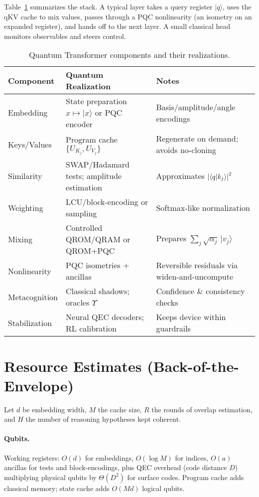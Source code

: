 \documentclass[11pt]{article}
\newcommand{\qket}[1]{\lvert #1 \rangle}
\newcommand{\qip}[2]{\langle #1 \vert #2 \rangle}
\begin{document}
Table~\ref{tab:components} summarizes the stack.
A typical layer takes a query register $\qket{q}$, uses the qKV cache to mix values, passes through a PQC nonlinearity (an isometry on an expanded register), and hands off to the next layer.
A small classical head monitors observables and steers control.

\begin{table}[h]
\centering
\caption{Quantum Transformer components and their realizations.}
\label{tab:components}
\begin{tabular}{@{}lll@{}}
\toprule
\textbf{Component} & \textbf{Quantum Realization} & \textbf{Notes} \\
\midrule
Embedding & State preparation $x\mapsto \qket{x}$ or PQC encoder & Basis/amplitude/angle encodings \\
Keys/Values & Program cache $\{U_{K_j},U_{V_j}\}$ & Regenerate on demand; avoids no-cloning \\
Similarity & SWAP/Hadamard tests; amplitude estimation & Approximates $\abs{\qip{q}{k_j}}^2$ \\
Weighting & LCU/block-encoding or sampling & Softmax-like normalization \\
Mixing & Controlled QROM/QRAM or QROM+PQC & Prepares $\sum_j \sqrt{\alpha_j}\,\qket{v_j}$ \\
Nonlinearity & PQC isometries + ancillas & Reversible residuals via widen-and-uncompute \\
Metacognition & Classical shadows; oracles $\Upsilon$ & Confidence \& consistency checks \\
Stabilization & Neural QEC decoders; RL calibration & Keeps device within guardrails \\
\bottomrule
\end{tabular}
\end{table}

\section{Resource Estimates (Back-of-the-Envelope)}

Let $d$ be embedding width, $M$ the cache size, $R$ the rounds of overlap estimation, and $H$ the number of reasoning hypotheses kept coherent.

\paragraph{Qubits.}
Working registers: $O(d)$ for embeddings, $O(\log M)$ for indices, $O(a)$ ancillas for tests and block-encodings, plus QEC overhead (code distance $D$) multiplying physical qubits by $\Theta(D^2)$ for surface codes.
Program cache adds classical memory; state cache adds $O(Md)$ logical qubits.
\end{document}
